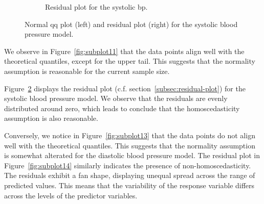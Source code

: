 \documentclass[12 pt]{scrartcl}
\numberwithin{equation}{section}
\begin{document}
\begin{figure}[H]
\begin{subfigure}[b]{0.49\textwidth}
        \caption{Residual plot for the systolic bp.}
        \label{fig:subplot12}
    \end{subfigure}
    \caption{Normal qq plot (left) and residual plot (right) for the systolic blood pressure model.}
\end{figure}

We observe in Figure~\ref{fig:subplot11} that the data points align well with the theoretical quantiles, 
except for the upper tail. This suggests that the normality assumption is reasonable for the current sample size.

Figure~\ref{fig:subplot12} displays the residual plot (c.f. section~\ref{subsec:residual-plot}) for the systolic blood pressure model.
We observe that the residuals are evenly distributed around zero, which leads to conclude that the homoscedasticity assumption is 
also reasonable.

Conversely, we notice in Figure~\ref{fig:subplot13} that the data points do not align well with the theoretical quantiles.
This suggests that the normality assumption is somewhat alterated for the diastolic blood pressure model.
The residual plot in Figure~\ref{fig:subplot14}  
similarly indicates the presence of non-homoscedasticity. The residuals exhibit a fan shape, 
displaying unequal spread across the range of predicted values.
This means that the variability of the response variable differs across the levels of the predictor variables. 
\end{document}
